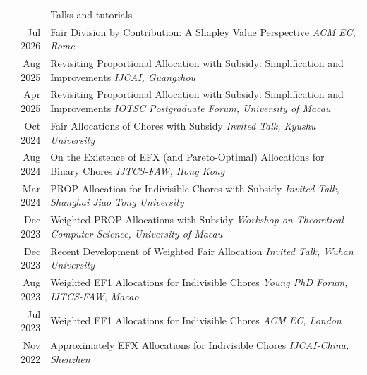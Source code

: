 \documentclass[letterpaper, 11pt]{article}
\newcommand{\headingfont}{\Large\color{OliveGreen}}
\newenvironment{SectionTable}[1]{
	\renewcommand*{\arraystretch}{1.2}
	\setlength{\tabcolsep}{10pt}
	\begin{longtable}{Rp{5.2in}} & #1 \\}
{\end{longtable}\vspace{-1cm}}
\begin{document}
\begin{SectionTable}{\headingfont Talks and tutorials}
Jul 2026 & Fair Division by Contribution: A Shapley Value Perspective \newline
\textit{ACM EC, Rome} \\

Aug 2025 & Revisiting Proportional Allocation with Subsidy: Simplification and Improvements \newline
\textit{IJCAI, Guangzhou} \\

Apr 2025 & Revisiting Proportional Allocation with Subsidy: Simplification and Improvements \newline
\textit{IOTSC Postgraduate Forum, University of Macau} \\

Oct 2024 &
Fair Allocations of Chores with Subsidy \newline
\textit{Invited Talk, Kyushu University} \\

Aug 2024 &
On the Existence of EFX (and Pareto-Optimal) Allocations for Binary Chores\newline
\textit{IJTCS-FAW, Hong Kong} \\

Mar 2024 &
PROP Allocation for Indivisible Chores with Subsidy \newline
\textit{Invited Talk, Shanghai Jiao Tong University} \\

Dec 2023 &
Weighted PROP Allocations with Subsidy \newline
\textit{Workshop on Theoretical Computer Science, University of Macau} \\

Dec 2023 &
Recent Development of Weighted Fair Allocation \newline
\textit{Invited Talk, Wuhan University} \\

Aug 2023 &
Weighted EF1 Allocations for Indivisible Chores \newline
\textit{Young PhD Forum, IJTCS-FAW, Macao} \\

Jul 2023 &
Weighted EF1 Allocations for Indivisible Chores \newline
\textit{ACM EC, London} \\

Nov 2022 &
Approximately EFX Allocations for Indivisible Chores \newline
\textit{IJCAI-China, Shenzhen} \\

\end{SectionTable}
\end{document}
